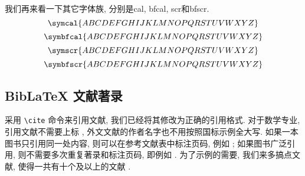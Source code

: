 我们再来看一下其它字体族, 分别是cal, bfcal, scr和bfscr.
\begin{equation}
  \symcal{ABCDEFGHIJKLMNOPQRSTUVWXYZ}
\end{equation}
\begin{equation}
  \symbfcal{ABCDEFGHIJKLMNOPQRSTUVWXYZ}
\end{equation}
\begin{equation}
  \symscr{ABCDEFGHIJKLMNOPQRSTUVWXYZ}
\end{equation}
\begin{equation}
  \symbfscr{ABCDEFGHIJKLMNOPQRSTUVWXYZ}
\end{equation}


\subsection{BibLaTeX 文献著录}\label{sec:exm-bib}

采用 \verb|\cite| 命令来引用文献, 我们已经将其修改为正确的引用格式. 对于数学专业, 引用文献不需要上标 \cite{atiyah_introduction_1969}, 外文文献的作者名字也不用按照国标示例全大写. 如果一本图书只引用同一处内容, 则可以在参考文献表中标注页码, 例如 \cite{herrlich_axiom_2006}; 如果图书广泛引用, 则不需要多次重复著录和标注页码, 即例如 \cite{atiyah_introduction_1969}. 为了示例的需要, 我们来多搞点文献, 使得一共有十个及以上的文献 \cite{jacobson_basic_1985, jacobson_basic_1989, zariski_commutative_1958, zariski_commutative_1960, ciarlet_linear_2013, flaherty_riemannian_1992, munkres_topology_2000, ahlfors_complex_1978, milne_algebraic_2017}.







